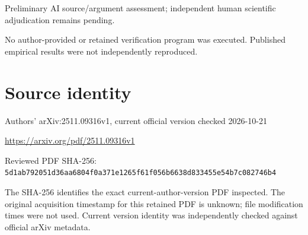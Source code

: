 \documentclass[11pt]{article}
\begin{document}
Preliminary AI source/argument assessment; independent human scientific adjudication remains pending.\par

No author-provided or retained verification program was executed. Published empirical results were not independently reproduced.\par

\section*{Source identity}

Authors’ arXiv:2511.09316v1, current official version checked 2026-10-21

\url{https://arxiv.org/pdf/2511.09316v1}

Reviewed PDF SHA-256: \nolinkurl{5d1ab792051d36aa6804f0a371e1265f61f056b6638d833455e54b7c082746b4}

The SHA-256 identifies the exact current-author-version PDF inspected. The original acquisition timestamp for this retained PDF is unknown; file modification times were not used. Current version identity was independently checked against official arXiv metadata.
\end{document}
